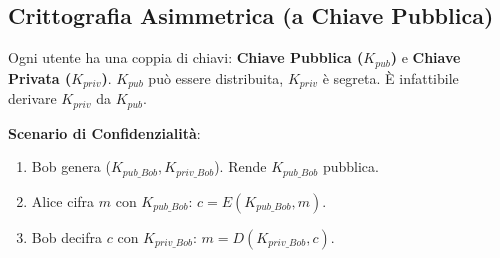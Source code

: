 \documentclass{article}
\begin{document}
\subsection{Crittografia Asimmetrica (a Chiave Pubblica)}
Ogni utente ha una coppia di chiavi: \textbf{Chiave Pubblica ($K_{pub}$)} e \textbf{Chiave Privata ($K_{priv}$)}.
$K_{pub}$ può essere distribuita, $K_{priv}$ è segreta. È infattibile derivare $K_{priv}$ da $K_{pub}$.

\textbf{Scenario di Confidenzialità}:
\begin{enumerate}
    \item Bob genera ($K_{pub\_Bob}, K_{priv\_Bob}$). Rende $K_{pub\_Bob}$ pubblica.
    \item Alice cifra $m$ con $K_{pub\_Bob}$: $c = E(K_{pub\_Bob}, m)$.
    \item Bob decifra $c$ con $K_{priv\_Bob}$: $m = D(K_{priv\_Bob}, c)$.
\end{enumerate}
\end{document}
